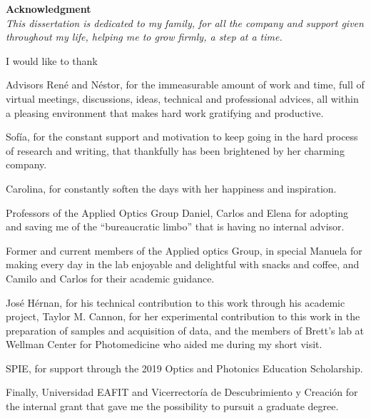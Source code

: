 \newcommand \agradecimientos{

\phantomsection
\addcontentsline{toc}{chapter}{\bf ACKNOWLEDGMENT}

    \begin{flushright}
{\bfseries \Large Acknowledgment} \\

\vspace{2\baselineskip}
\textit{ This dissertation is dedicated to my family, for all the company and support given throughout my life, helping me to grow firmly, a step at a time.}\\
    \end{flushright}	

\vspace{2\baselineskip}
\noindent I would like to thank

Advisors René and Néstor, for the immeasurable amount of work and time, full of virtual meetings, discussions, ideas, technical and professional advices, all within a pleasing environment that makes hard work gratifying and productive.

Sofía, for the constant support and motivation to keep going in the hard process of research and writing, that thankfully has been brightened by her charming company.

Carolina, for constantly soften the days with her happiness and inspiration.

Professors of the Applied Optics Group Daniel, Carlos and Elena for adopting and saving me of the ``bureaucratic limbo'' that is having no internal advisor.

Former and current members of the Applied optics Group, in special Manuela for making every day in the lab enjoyable and delightful with snacks and coffee, and Camilo and Carlos for their academic guidance.

José Hérnan, for his technical contribution to this work through his academic project, Taylor M. Cannon, for her experimental contribution to this work in the preparation of samples and acquisition of data, and the members of Brett's lab at Wellman Center for Photomedicine who aided me during my short visit.

SPIE, for support through the 2019 Optics and Photonics Education Scholarship.

Finally, Universidad EAFIT and Vicerrectoría de Descubrimiento y Creación for the internal grant that gave me the possibility to pursuit a graduate degree. 

}

\contraportada
\thispagestyle{empty}
\newpage\null\thispagestyle{empty}\newpage

\portada 
\thispagestyle{empty}
\newpage\null\thispagestyle{empty}\newpage


\dedicatoria
\newpage\null\thispagestyle{empty}\newpage

\thispagestyle{empty}
\newpage
\agradecimientos


